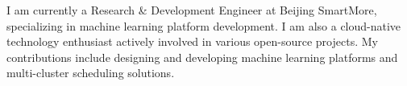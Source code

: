 

\begin{cvparagraph}

I am currently a Research \& Development Engineer at Beijing SmartMore, specializing in machine learning platform development. I am also a cloud-native technology enthusiast actively involved in various open-source projects. My contributions include designing and developing machine learning platforms and multi-cluster scheduling solutions.
\end{cvparagraph}
